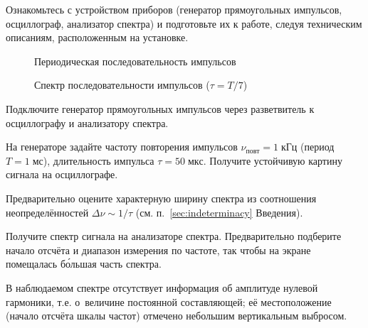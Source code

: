 \begin{lab:task}

\taskpreamble{~}
\vspace*{-8ex} %



\item Ознакомьтесь с устройством приборов (генератор прямоугольных импульсов,
осциллограф, анализатор спектра) и подготовьте их к работе,
следуя техническим описаниям, расположенным на установке.

\begin{figure}[h!]
    \hfil\hfil
    \begin{minipage}{0.4\textwidth}
        \caption{Периодическая последовательность импульсов}
    \end{minipage}
    \hfil
    \begin{minipage}{0.4\textwidth}
        \caption{Спектр последовательности импульсов ($\tau=T/7$)}
    \end{minipage}
\end{figure}

\item Подключите генератор прямоугольных импульсов через разветвитель
к осциллографу и анализатору спектра.

\item На генераторе задайте частоту повторения импульсов
$\nu_{повт} = 1\;кГц$ (период $T=1\;мс$), длительность импульса
$\tau=50\;мкс$. Получите устойчивую картину сигнала на осциллографе.

\item Предварительно оцените характерную ширину спектра
из соотношения неопределённостей $\Delta \nu \sim 1/\tau$
(см.  п.~\ref{sec:indeterminacy} Введения).

\item Получите спектр сигнала на анализаторе спектра. Предварительно
подберите начало отсчёта и диапазон измерения по частоте,
так чтобы на экране помещалась б\'{о}льшая часть спектра.

В наблюдаемом спектре отсутствует информация об амплитуде нулевой гармоники,
т.е. о~величине постоянной составляющей; её местоположение (начало отсчёта шкалы
частот) отмечено небольшим вертикальным выбросом.


\end{lab:task}
